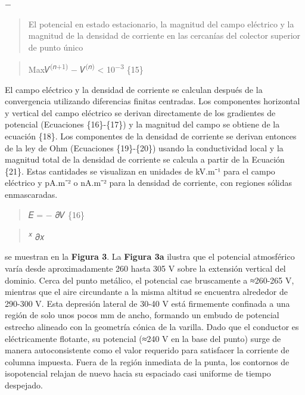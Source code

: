 \documentclass[
]{article}
\begin{document}
−

\begin{quote}
El potencial en estado estacionario, la magnitud del campo eléctrico y
la magnitud de la densidad de corriente en las cercanías del colector
superior de punto único
\end{quote}

\begin{quote}
Max\textbar 𝑉\textsuperscript{(𝑛+1)} − 𝑉\textsuperscript{(𝑛)}\textbar{}
\textless{} 10\textsuperscript{−3} \{15\}
\end{quote}

El campo eléctrico y la densidad de corriente se calculan después de la
convergencia utilizando diferencias finitas centradas. Los componentes
horizontal y vertical del campo eléctrico se derivan directamente de los
gradientes de potencial (Ecuaciones \{16\}-\{17\}) y la magnitud del
campo se obtiene de la ecuación \{18\}. Los componentes de la densidad
de corriente se derivan entonces de la ley de Ohm (Ecuaciones
\{19\}-\{20\}) usando la conductividad local y la magnitud total de la
densidad de corriente se calcula a partir de la Ecuación \{21\}. Estas
cantidades se visualizan en unidades de kV.m⁻¹ para el campo eléctrico y
pA.m⁻² o nA.m⁻² para la densidad de corriente, con regiones sólidas
enmascaradas.

\begin{quote}
𝐸 = − 𝜕𝑉 \{16\}
\end{quote}

\begin{quote}
\textsuperscript{𝑥} 𝜕𝑥
\end{quote}

se muestran en la \textbf{Figura 3}. La \textbf{Figura 3a} ilustra que
el potencial atmosférico varía desde aproximadamente 260 hasta 305 V
sobre la extensión vertical del dominio. Cerca del punto metálico, el
potencial cae bruscamente a ≈260-265 V, mientras que el aire circundante
a la misma altitud se encuentra alrededor de 290-300 V. Esta depresión
lateral de 30-40 V está firmemente confinada a una región de solo unos
pocos mm de ancho, formando un embudo de potencial estrecho alineado con
la geometría cónica de la varilla. Dado que el conductor es
eléctricamente flotante, su potencial (≈240 V en la base del punto)
surge de manera autoconsistente como el valor requerido para satisfacer
la corriente de columna impuesta. Fuera de la región inmediata de la
punta, los contornos de isopotencial relajan de nuevo hacia su espaciado
casi uniforme de tiempo despejado.
\end{document}
